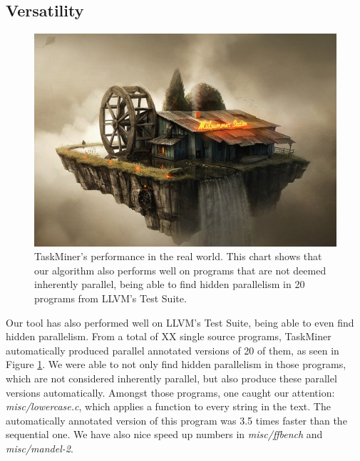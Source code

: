 \documentclass[sigplan,10pt,review,anonymous]{acmart}
\newcommand\Taskminer{\mbox{\textsf{TaskMiner}}}
\begin{document}
\subsection{Versatility}
\label{sub:versatility}

\begin{figure}[htb]
\begin{center}
\includegraphics[width=1\columnwidth]{images/Stub}
\caption{{\Taskminer}'s performance in the real world. This chart shows that our algorithm also performs
well on programs that are not deemed inherently parallel, being able to find hidden parallelism
in 20 programs from LLVM's Test Suite.}
\label{fig:testsuite}
\end{center}
\end{figure}

Our tool has also performed well on \textsf{LLVM's Test Suite}, being able to even find hidden parallelism.
From a total of XX single source programs,
{\Taskminer} automatically produced parallel annotated versions of 20 of them, as seen in Figure
\ref{fig:testsuite}. We were able to not only find hidden parallelism in those programs, which are not
considered inherently parallel, but also produce these parallel versions automatically. Amongst
those programs, one caught our attention: \textit{misc/lowercase.c}, which applies a function to every
string in the text. The automatically annotated version of this program was 3.5 times faster than
the sequential one. We have also nice speed up numbers in \textit{misc/ffbench} and \textit{misc/mandel-2}.
\end{document}
